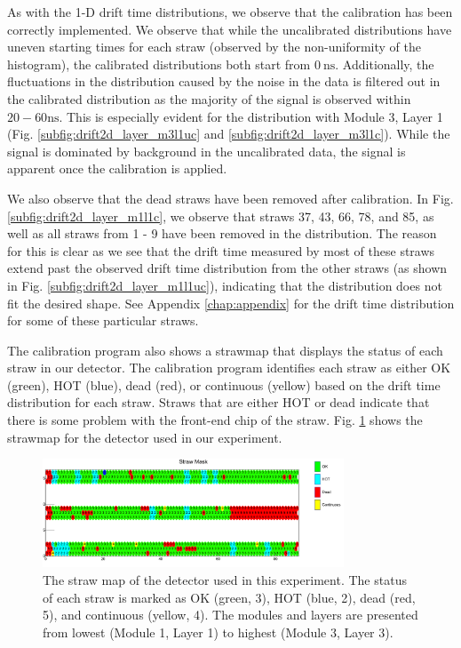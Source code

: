 \documentclass[a4paper]{report}
\numberwithin{equation}{section}
\begin{document}
As with the 1-D drift time distributions, we observe that the calibration has been correctly implemented. We observe that while the 
uncalibrated distributions have uneven starting times for each straw (observed by the non-uniformity of the histogram), the calibrated 
distributions both start from $\SI{0}{\nano\second}$. Additionally, the fluctuations in the distribution caused by the noise
in the data is filtered out in the calibrated distribution as the majority of the signal is observed within $20 - 60 \si{\nano\second}$. 
This is especially evident for the distribution with Module 3, Layer 1 (Fig. \ref{subfig:drift2d_layer_m3l1uc} and \ref{subfig:drift2d_layer_m3l1c}). 
While the signal is dominated by background in the uncalibrated data, the signal is apparent once the calibration is applied. \par 

We also observe that the dead straws have been removed after calibration. In Fig. \ref{subfig:drift2d_layer_m1l1c}, we observe that 
straws 37, 43, 66, 78, and 85, as well as all straws from 1 - 9 have been removed in the distribution. The reason for this is clear as we see that 
the drift time measured by most of these straws extend past the observed drift time distribution from the other straws (as shown in Fig. 
\ref{subfig:drift2d_layer_m1l1uc}), indicating that the distribution does not fit the desired shape. See Appendix \ref{chap:appendix} for the drift time 
distribution for some of these particular straws. \par 

The calibration program also shows a strawmap that displays the status of each straw in our detector. The calibration program 
identifies each straw as either OK (green), HOT (blue), dead (red), or continuous (yellow) based on the drift time distribution 
for each straw. Straws that are either HOT or dead indicate that there is some problem with the front-end chip of the straw.
Fig. \ref{fig:calib_strawmap} shows the strawmap for the detector used in our experiment. 

\begin{figure}[htb!]
	\centering
	\includegraphics[width=0.8\textwidth]{calib_strawmask.png}
	\caption{The straw map of the detector used in this experiment. The status of each straw is marked as OK (green, 3), 
	HOT (blue, 2), dead (red, 5), and continuous (yellow, 4). The modules and layers are presented from lowest 
	(Module 1, Layer 1) to highest (Module 3, Layer 3).}
	\label{fig:calib_strawmap}
\end{figure}
\end{document}
